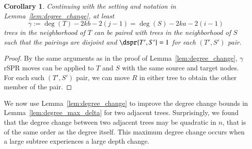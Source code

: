 \documentclass[]{elsarticle}
\newtheorem{cor}[thm]{Corollary}
\newcommand{\overlap}{%
	\gamma
}
\begin{document}
\begin{cor}
\label{cor:paired_neighbors}
Continuing with the setting and notation in Lemma~\ref{lem:degree_change}, at least
$$\overlap := \deg(T) - 2kb - 2(j-1) = \deg(S) - 2ka - 2(i-1)$$
trees in the neighborhood of $T$ can be paired with trees in the neighborhood of $S$ such that the pairings are disjoint and $\dspr{T',S'} = 1$ for each $(T',S')$ pair.
\end{cor}
\begin{proof}
By the same arguments as in the proof of Lemma~\ref{lem:degree_change}, $\overlap$ rSPR moves can be applied to $T$ and $S$ with the same source and target nodes.
For each such $(T',S')$ pair, we can move $R$ in either tree to obtain the other member of the pair.
\end{proof}

We now use Lemma~\ref{lem:degree_change} to improve the degree change bounds in Lemma~\ref{lem:degree_max_delta} for two adjacent trees.
Surprisingly, we found that the degree change between two adjacent trees may be quadratic in $n$, that is of the same order as the degree itself.
This maximum degree change occurs when a large subtree experiences a large depth change.
\end{document}
